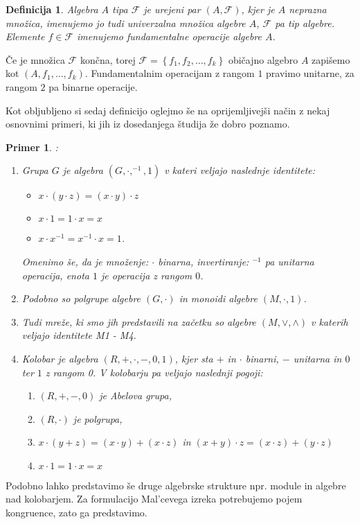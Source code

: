 \documentclass[a4paper,11pt]{article}
\newtheorem{definicija}{Definicija}
\newtheorem{primer}{Primer}
\begin{document}
\begin{definicija} \emph{Algebra $A$} tipa $\mathcal{F}$ je urejeni par $\left(A, \mathcal{F}\right)$, kjer je $A$ neprazna 
množica, imenujemo jo tudi \emph{univerzalna množica} algebre $A$, $\mathcal{F}$ pa tip algebre. Elemente $f \in 
\mathcal{F}$ imenujemo \emph{fundamentalne operacije} algebre $A$. 
\end{definicija}

Če je množica $\mathcal{F}$ končna, torej $\mathcal{F} = \left\{f_1, f_2, \dots, f_k\right\}$ običajno algebro $A$ 
zapišemo kot $\left(A, f_1, \dots, f_k\right)$. Fundamentalnim operacijam z rangom $1$ pravimo unitarne, za rangom $2$ 
pa binarne operacije.

Kot obljubljeno si sedaj definicijo oglejmo še na oprijemljivejši način z nekaj osnovnimi primeri, ki jih iz dosedanjega
študija že dobro poznamo.

\begin{primer}:
\begin{enumerate}
    \item Grupa $G$ je algebra $\left(G, \cdot, ^{-1}, 1\right)$ v kateri veljajo naslednje identitete:
    \begin{itemize}
        \item[G1] $x \cdot \left(y \cdot z\right) = \left(x \cdot y\right) \cdot z$
        \item[G2] $x \cdot 1 = 1 \cdot x = x$
        \item[G3] $x \cdot x^{-1} = x^{-1} \cdot x = 1$.
    \end{itemize} 
    Omenimo še, da je množenje: $\cdot$ binarna, invertiranje: $^{-1}$ pa unitarna operacija, enota $1$ je operacija 
    z rangom $0$. 
    \item Podobno so polgrupe algebre $\left(G, \cdot\right)$ in monoidi algebre  $\left(M, \cdot, 1\right)$.
    \item Tudi mreže, ki smo jih predstavili na začetku so algebre $\left(M,\vee, \wedge\right)$ v katerih veljajo
    identitete M1 - M4. 
    \item Kolobar je algebra $\left(R, +, \cdot, -, 0, 1\right)$, kjer sta $+$ in $\cdot$ binarni, $-$ unitarna in $0$ 
    ter $1$ z rangom 0. V kolobarju pa veljajo naslednji pogoji:
    \begin{enumerate}
        \item[R1] $\left(R, +, -, 0\right)$ je Abelova grupa,
        \item[R2] $\left(R, \cdot\right)$ je polgrupa, 
        \item[R3] $x \cdot \left(y + z\right) = \left(x \cdot y\right) + \left(x \cdot z\right)$ in
        $\left(x + y\right) \cdot z = \left(x \cdot z\right) + \left(y \cdot z\right)$
        \item[G2] $x \cdot 1 = 1 \cdot x = x$
    \end{enumerate}
\end{enumerate}
\end{primer}
Podobno lahko predstavimo še druge algebrske strukture npr. module in algebre nad kolobarjem.
Za formulacijo Mal'cevega izreka potrebujemo pojem kongruence, zato ga predstavimo.
\end{document}

